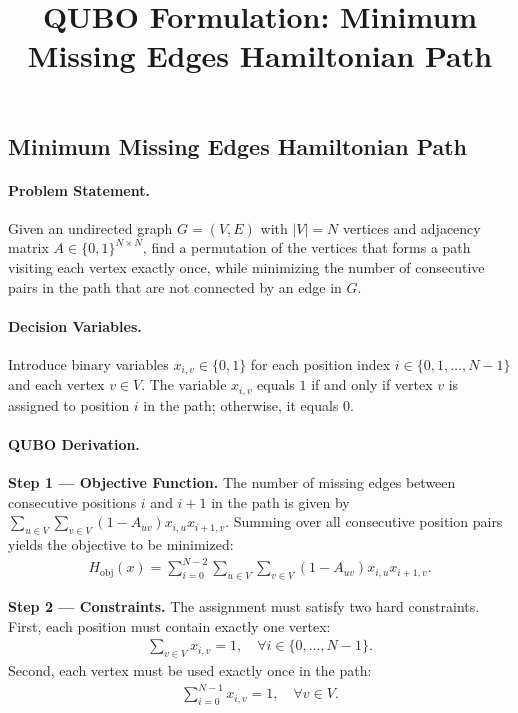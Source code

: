 \documentclass[12pt]{article}
\title{QUBO Formulation: Minimum Missing Edges Hamiltonian Path}
\date{}
\begin{document}
\maketitle

\subsection*{Minimum Missing Edges Hamiltonian Path}

\paragraph{Problem Statement.}
Given an undirected graph $G=(V,E)$ with $|V|=N$ vertices and adjacency matrix $A \in \{0,1\}^{N \times N}$, find a permutation of the vertices that forms a path visiting each vertex exactly once, while minimizing the number of consecutive pairs in the path that are not connected by an edge in $G$.

\paragraph{Decision Variables.}
Introduce binary variables $x_{i,v} \in \{0,1\}$ for each position index $i \in \{0, 1, \dots, N-1\}$ and each vertex $v \in V$. The variable $x_{i,v}$ equals $1$ if and only if vertex $v$ is assigned to position $i$ in the path; otherwise, it equals $0$.

\paragraph{QUBO Derivation.}
\textbf{Step 1 --- Objective Function.} The number of missing edges between consecutive positions $i$ and $i+1$ in the path is given by $\sum_{u \in V} \sum_{v \in V} (1 - A_{uv}) x_{i,u} x_{i+1,v}$. Summing over all consecutive position pairs yields the objective to be minimized:
\begin{align}
H_{\text{obj}}(x) = \sum_{i=0}^{N-2} \sum_{u \in V} \sum_{v \in V} (1 - A_{uv}) x_{i,u} x_{i+1,v}.
\end{align}

\textbf{Step 2 --- Constraints.} The assignment must satisfy two hard constraints. First, each position must contain exactly one vertex:
\begin{align}
\sum_{v \in V} x_{i,v} = 1, \quad \forall i \in \{0, \dots, N-1\}.
\end{align}
Second, each vertex must be used exactly once in the path:
\begin{align}
\sum_{i=0}^{N-1} x_{i,v} = 1, \quad \forall v \in V.
\end{align}
\end{document}

